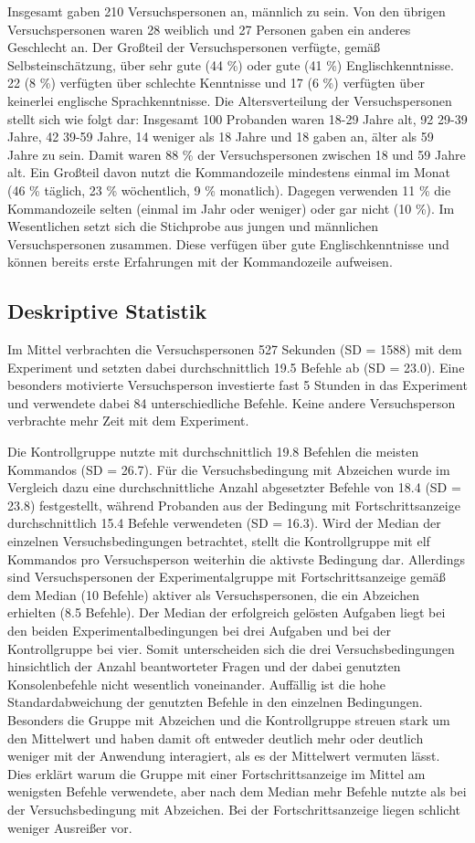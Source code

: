 Insgesamt gaben 210 Versuchspersonen an, männlich zu sein. Von den übrigen Versuchspersonen waren 28 weiblich und 27 Personen gaben ein anderes Geschlecht an. Der Großteil der Versuchspersonen verfügte, gemäß Selbsteinschätzung, über sehr gute (44 \%) oder gute (41 \%) Englischkenntnisse. 22 (8 \%) verfügten über schlechte Kenntnisse und 17 (6 \%) verfügten über keinerlei englische Sprachkenntnisse. Die Altersverteilung der Versuchspersonen stellt sich wie folgt dar: Insgesamt 100 Probanden waren 18-29 Jahre alt, 92  29-39 Jahre,  42 39-59 Jahre, 14 weniger als 18 Jahre und 18 gaben an, älter als 59 Jahre zu sein. Damit waren 88 \% der Versuchspersonen zwischen 18 und 59 Jahre alt. Ein Großteil davon nutzt die Kommandozeile mindestens einmal im Monat (46 \% täglich, 23 \% wöchentlich, 9 \% monatlich). Dagegen verwenden 11 \% die Kommandozeile selten (einmal im Jahr oder weniger) oder gar nicht (10 \%). Im Wesentlichen setzt sich die Stichprobe aus jungen und männlichen Versuchspersonen zusammen. Diese verfügen über gute Englischkenntnisse und können bereits erste Erfahrungen mit der Kommandozeile aufweisen.

\subsection{Deskriptive Statistik}
Im Mittel verbrachten die Versuchspersonen 527 Sekunden (SD = 1588) mit dem Experiment und setzten dabei durchschnittlich 19.5 Befehle ab (SD = 23.0). Eine besonders motivierte Versuchsperson investierte fast 5 Stunden in das Experiment und verwendete dabei 84 unterschiedliche Befehle. Keine andere Versuchsperson verbrachte mehr Zeit mit dem Experiment.


Die Kontrollgruppe nutzte mit durchschnittlich 19.8 Befehlen die meisten Kommandos (SD = 26.7). Für die Versuchsbedingung mit Abzeichen wurde im Vergleich dazu eine durchschnittliche Anzahl abgesetzter Befehle von 18.4 (SD = 23.8) festgestellt, während Probanden aus der Bedingung mit Fortschrittsanzeige durchschnittlich 15.4 Befehle verwendeten (SD = 16.3). Wird der Median der einzelnen Versuchsbedingungen betrachtet, stellt die Kontrollgruppe mit elf Kommandos pro Versuchsperson weiterhin die aktivste Bedingung dar. Allerdings sind Versuchspersonen der Experimentalgruppe mit Fortschrittsanzeige gemäß dem Median (10 Befehle) aktiver als Versuchspersonen, die ein Abzeichen erhielten (8.5 Befehle). Der Median der erfolgreich gelösten Aufgaben liegt bei den beiden Experimentalbedingungen bei drei Aufgaben und bei der Kontrollgruppe bei vier. Somit unterscheiden sich die drei Versuchsbedingungen hinsichtlich der Anzahl beantworteter Fragen und der dabei genutzten Konsolenbefehle nicht wesentlich voneinander. Auffällig ist die hohe Standardabweichung der genutzten Befehle in den einzelnen Bedingungen. Besonders die Gruppe mit Abzeichen und die Kontrollgruppe streuen stark um den Mittelwert und haben damit oft entweder deutlich mehr oder deutlich weniger mit der Anwendung interagiert, als es der Mittelwert vermuten lässt. Dies erklärt warum die Gruppe mit einer Fortschrittsanzeige im Mittel am wenigsten Befehle verwendete, aber nach dem Median mehr Befehle nutzte als bei der Versuchsbedingung mit Abzeichen. Bei der Fortschrittsanzeige liegen schlicht weniger Ausreißer vor.  


